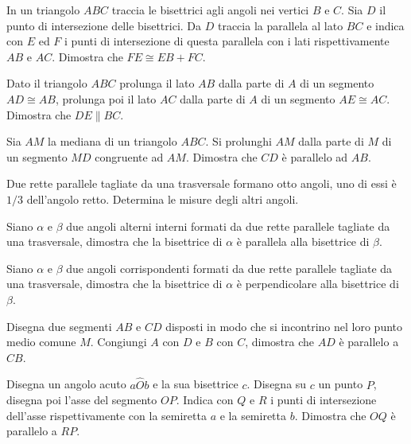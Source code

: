 \begin{multicols}{2}
\begin{esercizio}
\label{ese:3.35}
In un triangolo $ABC$ traccia le bisettrici agli angoli nei vertici $B$ e $C$. Sia $D$ il punto di intersezione delle bisettrici. Da $D$ traccia la parallela al lato $BC$ e indica con $E$ ed $F$ i punti di intersezione di questa parallela con i lati rispettivamente $AB$ e $AC$. Dimostra che $FE\cong EB+FC$.
\end{esercizio}

\begin{esercizio}
\label{ese:3.36}
Dato il triangolo $ABC$ prolunga il lato $AB$ dalla parte di $A$ di un segmento $AD\cong AB$, prolunga poi il lato $AC$ dalla parte di $A$ di un segmento $AE\cong AC$. Dimostra che $DE\parallel BC$.
\end{esercizio}

\begin{esercizio}
\label{ese:3.37}
Sia $AM$ la mediana di un triangolo $ABC$. Si prolunghi $AM$ dalla parte di $M$ di un segmento $MD$ congruente ad $AM$. Dimostra che $CD$ è parallelo ad $AB$.
\end{esercizio}

\begin{esercizio}
\label{ese:3.38}
Due rette parallele tagliate da una trasversale formano otto angoli, uno di essi è $1/3$ dell'angolo retto. Determina le misure degli altri angoli.
\end{esercizio}

\begin{esercizio}
\label{ese:3.39}
Siano $\alpha$ e $\beta$ due angoli alterni interni formati da due rette parallele tagliate da una trasversale, dimostra che la bisettrice di $\alpha$ è parallela alla bisettrice di $\beta$.
\end{esercizio}

\begin{esercizio}
\label{ese:3.40}
Siano $\alpha$ e $\beta$ due angoli corrispondenti formati da due rette parallele tagliate da una trasversale, dimostra che la bisettrice di $\alpha$ è perpendicolare alla bisettrice di $\beta$.
\end{esercizio}

\begin{esercizio}
\label{ese:3.41}
Disegna due segmenti $AB$ e $CD$ disposti in modo che si incontrino nel loro punto medio comune $M$. Congiungi $A$ con $D$ e $B$ con $C$, dimostra che $AD$ è parallelo a $CB$.
\end{esercizio}

\begin{esercizio}
\label{ese:3.42}
Disegna un angolo acuto $a\widehat{O}b$ e la sua bisettrice $c$. Disegna su $c$ un punto $P$, disegna poi l'asse del segmento $OP$. Indica con $Q$ e $R$ i punti di intersezione dell'asse rispettivamente con la semiretta $a$ e la semiretta $b$. Dimostra che $OQ$ è parallelo a $RP$.
\end{esercizio}


\end{multicols}
